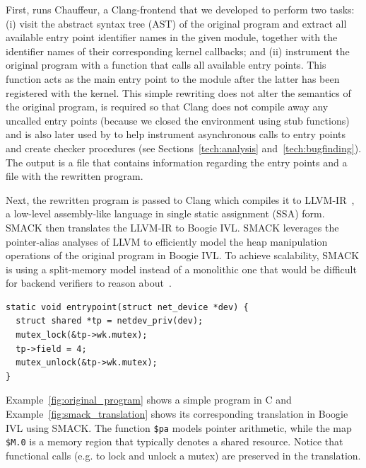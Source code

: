 First, \whoop runs Chauffeur, a Clang-frontend that we developed to perform two tasks: (i) visit the abstract syntax tree (AST) of the original program and extract all available entry point identifier names in the given module, together with the identifier names of their corresponding kernel callbacks; and (ii) instrument the original program with a function that calls all available entry points. This function acts as the main entry point to the module after the latter has been registered with the kernel. This simple rewriting does not alter the semantics of the original program, is required so that Clang does not compile away any uncalled entry points (because we closed the environment using stub functions) and is also later used by \whoop to help instrument asynchronous calls to entry points and create checker procedures (see Sections~\ref{tech:analysis} and~\ref{tech:bugfinding}). The output is a file that contains information regarding the entry points and a file with the rewritten program.

Next, the rewritten program is passed to Clang which compiles it to LLVM-IR~\cite{lattner2004llvm}, a low-level assembly-like language in single static assignment (SSA) form. SMACK then translates the LLVM-IR to Boogie IVL. SMACK leverages the pointer-alias analyses of LLVM to efficiently model the heap manipulation operations of the original program in Boogie IVL. To achieve scalability, SMACK is using a split-memory model instead of a monolithic one that would be difficult for backend verifiers to reason about~\cite{rakamaric2009scalable}.

\begin{lstlisting}[caption = Simple networking entry point in C, label = fig:original_program]
static void entrypoint(struct net_device *dev) {
  struct shared *tp = netdev_priv(dev);
  mutex_lock(&tp->wk.mutex);
  tp->field = 4;
  mutex_unlock(&tp->wk.mutex);
}
\end{lstlisting}

Example~\ref{fig:original_program} shows a simple program in C and Example~\ref{fig:smack_translation} shows its corresponding translation in Boogie IVL using SMACK. The function \texttt{\$pa} models pointer arithmetic, while the map \texttt{\$M.0} is a memory region that typically denotes a shared resource. Notice that functional calls (e.g. to lock and unlock a mutex) are preserved in the translation.


